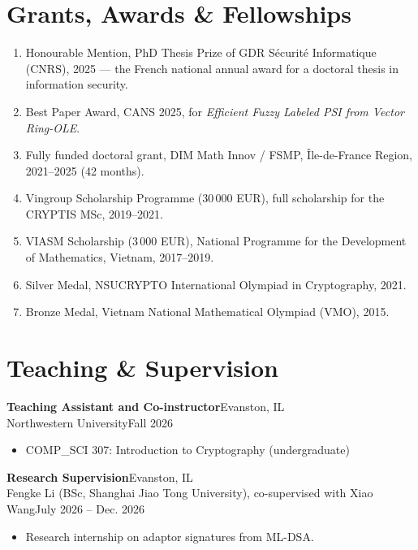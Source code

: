 \documentclass[11pt]{article}
\newcommand{\entry}[4]{%
  \noindent\textbf{#1}\hfill #2\\[0.15em]
  \noindent #3\hfill #4\par\vspace{0.45em}}
\begin{document}
\section{Grants, Awards \& Fellowships}
\begin{enumerate}
  \item Honourable Mention, PhD Thesis Prize of GDR S\'ecurit\'e Informatique (CNRS), 2025 --- the French national annual award for a doctoral thesis in information security.
  \item Best Paper Award, CANS 2025, for \emph{Efficient Fuzzy Labeled PSI from Vector Ring-OLE}.
  \item Fully funded doctoral grant, DIM Math Innov / FSMP, \^Ile-de-France Region, 2021--2025 (42 months).
  \item Vingroup Scholarship Programme (30\,000 EUR), full scholarship for the CRYPTIS MSc, 2019--2021.
  \item VIASM Scholarship (3\,000 EUR), National Programme for the Development of Mathematics, Vietnam, 2017--2019.
  \item Silver Medal, NSUCRYPTO International Olympiad in Cryptography, 2021.
  \item Bronze Medal, Vietnam National Mathematical Olympiad (VMO), 2015.
\end{enumerate}

\section{Teaching \& Supervision}

\entry{Teaching Assistant and Co-instructor}{Evanston, IL}
      {Northwestern University}{Fall 2026}
\vspace{-0.35em}
\begin{itemize}
  \item COMP\_SCI 307: Introduction to Cryptography (undergraduate)
\end{itemize}

\vspace{0.3em}
\entry{Research Supervision}{Evanston, IL}
      {Fengke Li (BSc, Shanghai Jiao Tong University), co-supervised with Xiao Wang}{July 2026 -- Dec. 2026}
\vspace{-0.6em}
\begin{itemize}
  \item Research internship on adaptor signatures from ML-DSA.
\end{itemize}
\end{document}

